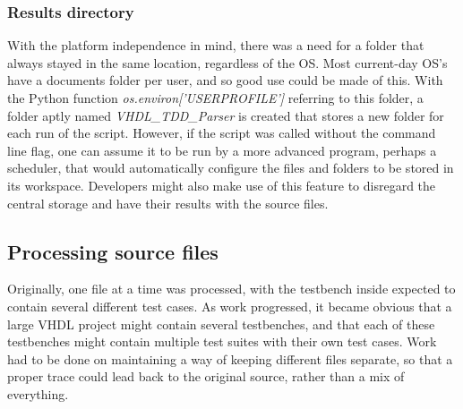 \documentclass[11pt,british]{article}
\begin{document}
\subsubsection{Results directory}
With the platform independence in mind, there was a need for a folder that always stayed in the same location, regardless of the \gls{OS}. Most current-day OS's have a documents folder per user, and so good use could be made of this. With the Python function \emph{os.environ['USERPROFILE']} referring to this folder, a folder aptly named \emph{VHDL\_TDD\_Parser} is created that stores a new folder for each run of the script. However, if the script was called without the command line flag, one can assume it to be run by a more advanced program, perhaps a scheduler, that would automatically configure the files and folders to be stored in its workspace. Developers might also make use of this feature to disregard the central storage and have their results with the source files.

\subsection{Processing source files}
Originally, one file at a time was processed, with the testbench inside expected to contain several different test cases. As work progressed, it became obvious that a large \gls{VHDL} project might contain several testbenches, and that each of these testbenches might contain multiple test suites with their own test cases. Work had to be done on maintaining a way of keeping different files separate, so that a proper trace could lead back to the original source, rather than a mix of everything. 
\end{document}
